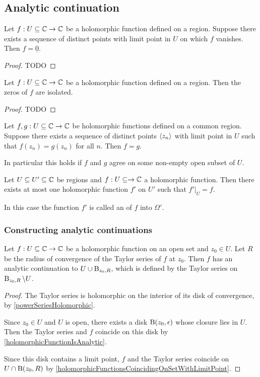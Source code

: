 \subsection{Analytic continuation}
\begin{proposition}
Let $f:U\subseteq \mathbb{C}\to \mathbb{C}$ be a holomorphic function defined on a region. Suppose there exists a sequence of distinct points with limit point in $U$ on which $f$ vanishes. Then $f = \underline{0}$.
\end{proposition}
\begin{proof}
TODO
\end{proof}
\begin{corollary} \label{zerosHolomorphicFunctionIsolated}
Let $f:U\subseteq \mathbb{C}\to \mathbb{C}$ be a holomorphic function defined on a region. Then the zeros of $f$ are isolated.
\end{corollary}
\begin{proof}
TODO
\end{proof}
\begin{corollary} \label{holomorphicFunctionsCoincidingOnSetWithLimitPoint}
Let $f,g:U\subseteq \mathbb{C}\to \mathbb{C}$ be holomorphic functions defined on a common region. Suppose there exists a sequence of distinct points $\left\langle z_n \right\rangle$ with limit point in $U$ such that $f(z_n) = g(z_n)$ for all $n$. Then $f = g$.
\end{corollary}
In particular this holds if $f$ and $g$ agree on some non-empty open subset of $U$.
\begin{corollary}
Let $U\subseteq U' \subseteq \mathbb{C}$ be regions and $f:U\subseteq\to \mathbb{C}$ a holomorphic function. Then there exists at most one holomorphic function $f'$ on $U'$ such that $f'|_U = f$.
\end{corollary}

\begin{definition}
In this case the function $f'$ is called an  of $f$ into $\Omega'$.
\end{definition}

\subsubsection{Constructing analytic continuations}
\begin{lemma}
Let $f: U\subseteq \mathbb{C}\to \mathbb{C}$ be a holomorphic function on an open set and $z_0\in U$. Let $R$ be the radius of convergence of the Taylor series of $f$ at $z_0$. Then $f$ has an analytic continuation to $U\cup \operatorname{B}_{z_0, R}$, which is defined by the Taylor series on $\operatorname{B}_{z_0, R}\setminus U$.
\end{lemma}
\begin{proof}
The Taylor series is holomorphic on the interior of its disk of convergence, by \ref{powerSeriesHolomorphic}.

Since $z_0\in U$ and $U$ is open, there exists a disk $\operatorname{B}(z_0, \epsilon)$ whose closure lies in $U$. Then the Taylor series and $f$ coincide on this disk by \ref{holomorphicFunctionIsAnalytic}.

Since this disk contains a limit point, $f$ and the Taylor series coincide on $U\cap \operatorname{B}(z_0, R)$ by \ref{holomorphicFunctionsCoincidingOnSetWithLimitPoint}.
\end{proof}

